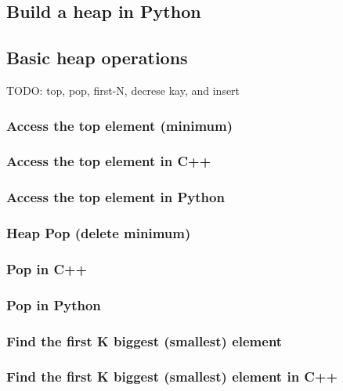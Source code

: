 \documentclass{article}
\begin{document}
\subsection*{Build a heap in Python}

\subsection{Basic heap operations}

TODO: top, pop, first-N, decrese kay, and insert

\subsubsection{Access the top element (minimum)}

\subsubsection*{Access the top element in C++}

\subsubsection*{Access the top element in Python}

\subsubsection{Heap Pop (delete minimum)}

\subsubsection*{Pop in C++}

\subsubsection*{Pop in Python}

\subsubsection{Find the first K biggest (smallest) element}

\subsubsection*{Find the first K biggest (smallest) element in C++}
\end{document}
